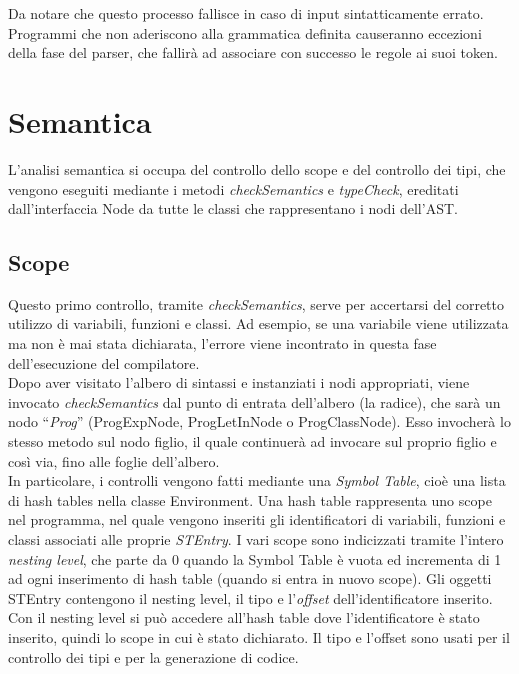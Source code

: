 \documentclass{scrreprt}
\begin{document}
Da notare che questo processo fallisce in caso di input sintatticamente errato. Programmi 
che non aderiscono alla grammatica definita causeranno eccezioni della fase
del parser, che fallirà ad associare con successo le regole ai suoi token. 

\chapter{Semantica}
L'analisi semantica si occupa del controllo dello scope e del controllo dei tipi, che vengono eseguiti mediante i metodi \textit{checkSemantics} e \textit{typeCheck}, 
ereditati dall'interfaccia Node da tutte le classi che rappresentano i nodi dell'AST.

\section{Scope}
Questo primo controllo, tramite \textit{checkSemantics}, serve per accertarsi del corretto utilizzo di variabili, funzioni e classi. Ad esempio, se una variabile viene utilizzata
ma non è mai stata dichiarata, l'errore viene incontrato in questa fase dell'esecuzione del compilatore. \\

Dopo aver visitato l'albero di sintassi e instanziati i nodi appropriati, 
viene invocato \textit{checkSemantics} dal punto di entrata dell'albero (la radice), che sarà un nodo ``\textit{Prog}'' (ProgExpNode, ProgLetInNode o ProgClassNode). 
Esso invocherà lo stesso metodo sul nodo figlio, il quale continuerà ad invocare sul proprio figlio e così via, fino alle foglie dell'albero.\\

In particolare, i controlli vengono fatti mediante una \textit{Symbol Table}, cioè una lista di hash tables nella classe Environment. Una hash table rappresenta uno scope nel programma,
nel quale vengono inseriti gli identificatori di variabili, funzioni e classi associati alle proprie \textit{STEntry}. I vari scope sono indicizzati tramite l'intero \textit{nesting level}, che parte da 0 quando 
la Symbol Table è vuota ed incrementa di 1 ad ogni inserimento di hash table (quando si entra in nuovo scope). Gli oggetti STEntry contengono il nesting level, il tipo e l'\textit{offset}
dell'identificatore inserito. Con il nesting level si può accedere all'hash table dove l'identificatore è stato inserito, quindi lo scope in cui è stato dichiarato. Il tipo e l'offset sono usati
per il controllo dei tipi e per la generazione di codice. \\
\end{document}
